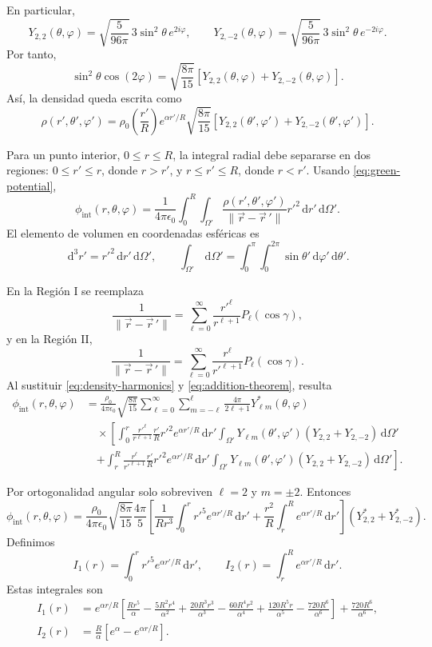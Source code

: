 \documentclass[a4paper,12pt]{article}
\newcommand{\dd}{\,\mathrm{d}}
\begin{document}
En particular,
\[
Y_{2,2}(\theta,\varphi)=\sqrt{\frac{5}{96\pi}}\,3\sin^2\theta\,e^{2i\varphi},
\qquad
Y_{2,-2}(\theta,\varphi)=\sqrt{\frac{5}{96\pi}}\,3\sin^2\theta\,e^{-2i\varphi}.
\]
Por tanto,
\[
\sin^2\theta\cos(2\varphi)
=\sqrt{\frac{8\pi}{15}}\left[Y_{2,2}(\theta,\varphi)+Y_{2,-2}(\theta,\varphi)\right].
\]
Así, la densidad queda escrita como
\begin{equation}
\label{eq:density-harmonics}
\rho(r',\theta',\varphi')=\rho_0\left(\frac{r'}{R}\right)e^{\alpha r'/R}
\sqrt{\frac{8\pi}{15}}\left[Y_{2,2}(\theta',\varphi')+Y_{2,-2}(\theta',\varphi')\right].
\end{equation}

Para un punto interior, $0\le r\le R$, la integral radial debe separarse en dos regiones:
$0\le r'\le r$, donde $r>r'$, y $r\le r'\le R$, donde $r<r'$. Usando \eqref{eq:green-potential},
\[
\phi_{\mathrm{int}}(r,\theta,\varphi)
=\frac{1}{4\pi\epsilon_0}\int_0^R\int_{\Omega'}
\frac{\rho(r',\theta',\varphi')}{\lVert\vec r-\vec r\,'\rVert}r'^2\dd r'\dd\Omega'.
\]
El elemento de volumen en coordenadas esféricas es
\[
\dd^3r'=r'^2\dd r'\dd\Omega',
\qquad
\int_{\Omega'}\dd\Omega'=\int_0^\pi\int_0^{2\pi}\sin\theta'\dd\varphi'\dd\theta'.
\]

En la Región I se reemplaza
\[
\frac{1}{\lVert\vec r-\vec r\,'\rVert}
=\sum_{\ell=0}^{\infty}\frac{r'^\ell}{r^{\ell+1}}P_\ell(\cos\gamma),
\]
y en la Región II,
\[
\frac{1}{\lVert\vec r-\vec r\,'\rVert}
=\sum_{\ell=0}^{\infty}\frac{r^\ell}{r'^{\ell+1}}P_\ell(\cos\gamma).
\]
Al sustituir \eqref{eq:density-harmonics} y \eqref{eq:addition-theorem}, resulta
\begin{align*}
\phi_{\mathrm{int}}(r,\theta,\varphi)
&=\frac{\rho_0}{4\pi\epsilon_0}\sqrt{\frac{8\pi}{15}}
\sum_{\ell=0}^{\infty}\sum_{m=-\ell}^{\ell}\frac{4\pi}{2\ell+1}Y_{\ell m}^*(\theta,\varphi) \\
&\quad \times \left[
\int_0^r\frac{r'^\ell}{r^{\ell+1}}\frac{r'}{R}r'^2e^{\alpha r'/R}\dd r'
\int_{\Omega'}Y_{\ell m}(\theta',\varphi')\left(Y_{2,2}+Y_{2,-2}\right)\dd\Omega'
\right.\\
&\quad\left.+
\int_r^R\frac{r^\ell}{r'^{\ell+1}}\frac{r'}{R}r'^2e^{\alpha r'/R}\dd r'
\int_{\Omega'}Y_{\ell m}(\theta',\varphi')\left(Y_{2,2}+Y_{2,-2}\right)\dd\Omega'
\right].
\end{align*}

Por ortogonalidad angular solo sobreviven $\ell=2$ y $m=\pm2$. Entonces
\[
\phi_{\mathrm{int}}(r,\theta,\varphi)
=\frac{\rho_0}{4\pi\epsilon_0}\sqrt{\frac{8\pi}{15}}\frac{4\pi}{5}
\left[\frac{1}{Rr^3}\int_0^r r'^5e^{\alpha r'/R}\dd r'
+\frac{r^2}{R}\int_r^R e^{\alpha r'/R}\dd r'\right]
\left(Y_{2,2}^*+Y_{2,-2}^*\right).
\]
Definimos
\[
I_1(r)=\int_0^r r'^5e^{\alpha r'/R}\dd r',
\qquad
I_2(r)=\int_r^R e^{\alpha r'/R}\dd r'.
\]
Estas integrales son
\begin{align*}
I_1(r)
&=e^{\alpha r/R}\left[\frac{Rr^5}{\alpha}-\frac{5R^2r^4}{\alpha^2}
+\frac{20R^3r^3}{\alpha^3}-\frac{60R^4r^2}{\alpha^4}
+\frac{120R^5r}{\alpha^5}-\frac{720R^6}{\alpha^6}\right]
+\frac{720R^6}{\alpha^6},\\
I_2(r)&=\frac{R}{\alpha}\left[e^\alpha-e^{\alpha r/R}\right].
\end{align*}
\end{document}
